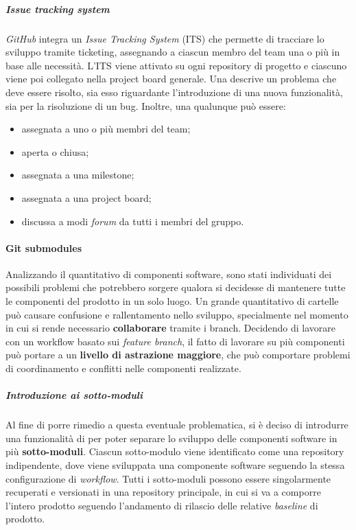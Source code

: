 		\subparagraph{Issue tracking system}

		\textit{GitHub} integra un \textit{Issue Tracking System} (ITS) che permette di tracciare lo sviluppo tramite ticketing, assegnando a ciascun membro del team una o più  in base alle necessità. L'ITS viene attivato su ogni repository di progetto e ciascuno viene poi collegato nella project board generale. Una  descrive un problema che deve essere risolto, sia esso riguardante l'introduzione di una nuova funzionalità, sia per la risoluzione di un bug. Inoltre, una qualunque  può essere:
		\begin{itemize}
			\item assegnata a uno o più membri del team;
			\item aperta o chiusa;
			\item assegnata a una milestone;
			\item assegnata a una project board;
			\item discussa a modi \textit{forum} da tutti i membri del gruppo.
		\end{itemize}


	\paragraph{Git submodules}

	Analizzando il quantitativo di componenti software, sono stati individuati dei possibili problemi che potrebbero sorgere qualora si decidesse di mantenere tutte le componenti del prodotto in un solo luogo. Un grande quantitativo di cartelle può causare confusione e rallentamento nello sviluppo, specialmente nel momento in cui si rende necessario \textbf{collaborare} tramite i branch. Decidendo di lavorare con un workflow basato sui \textit{feature branch}, il fatto di lavorare su più componenti può portare a un \textbf{livello di astrazione maggiore}, che può comportare problemi di coordinamento e conflitti nelle componenti realizzate.

		\subparagraph{Introduzione ai sotto-moduli}

		Al fine di porre rimedio a questa eventuale problematica, si è deciso di introdurre una funzionalità di  per poter separare lo sviluppo delle componenti software in più \textbf{sotto-moduli}. Ciascun sotto-modulo viene identificato come una repository indipendente, dove viene sviluppata una componente software seguendo la stessa configurazione di \textit{workflow}. 
		Tutti i sotto-moduli possono essere singolarmente recuperati e versionati in una repository principale, in cui si va a comporre l'intero prodotto seguendo l'andamento di rilascio delle relative \textit{baseline} di prodotto.

